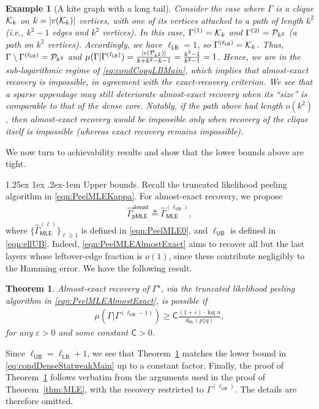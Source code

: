 \documentclass[12pt]{article}
\makeatletter
\newtheorem{example}{Example}
\newtheorem{theorem}{Theorem}
\newcommand{\calK}{{\cal K}}
\newcommand{\calP}{{\cal P}}
\newcommand{\s}[1]{\mathsf{#1}}
\renewcommand{\paragraph}{%
  \@startsection{paragraph}{4}%
  {\z@}{1.25ex \@plus 1ex \@minus .2ex}{-1em}%
  {\normalfont\normalsize\bfseries}%
}
\makeatother
\begin{document}
\begin{example}[A kite graph with a long tail]
Consider the case where $\Gamma$ is a clique $\calK_k$ on $k = |v(\calK_k)|$ vertices, with one of its vertices attached to a path of length $k^2$ (i.e., $k^2-1$ edges and $k^2$ vertices). In this case, $\Gamma^{(1)} = \calK_k$ and $\Gamma^{(2)} = \calP_{k^2}$ (a path on $k^2$ vertices). Accordingly, we have $\ell_{\s{LB}} = 1$, so $\Gamma^{(\ell_{\s{LB}})} = \calK_k$. Thus, $\Gamma\setminus\Gamma^{(\ell_{\s{LB}})} = \calP_{k^2}$ and $\mu(\Gamma\vert\Gamma^{(\ell_{\s{LB}})}) = \frac{|e(\calP_{k^2})|}{k+k^2-k-1} = \frac{k^2-1}{k^2-1} = 1$. Hence, we are in the sub-logarithmic regime of \eqref{eq:condCopyLBMain}, which implies that almost-exact recovery is impossible, in agreement with the exact-recovery criterion. We see that a sparse appendage may still deteriorate almost-exact recovery when its ``size'' is comparable to that of the dense core. Notably, if the path above had length $o(k^2)$, then almost-exact recovery would be impossible only when recovery of the clique itself is impossible (whereas exact recovery remains impossible).
\end{example}

We now turn to achievability results and show that the lower bounds above are tight.

\paragraph{Upper bounds.} Recall the truncated likelihood peeling algorithm in \eqref{eqn:PeelMLEKappa}. For almost-exact recovery, we propose
\begin{align}
    \hat{\Gamma}^{\s{almost}}_{\s{pMLE}} \triangleq \hat{\Gamma}^{(\ell_{\s{UB}})}_{\s{MLE}},\label{eqn:PeelMLEAlmostExact}
\end{align}
where $\{\hat{\Gamma}^{(\ell)}_{\s{MLE}}\}_{\ell\geq1}$ is defined in \eqref{eqn:PeelMLE0}, and $\ell_{\s{UB}}$ is defined in \eqref{eqn:ellUB}. Indeed, \eqref{eqn:PeelMLEAlmostExact} aims to recover all but the last layers whose leftover-edge fraction is $o(1)$, since these contribute negligibly to the Hamming error. We have the following result.
\begin{theorem}\label{thm:AlmostExactRec}
Almost-exact recovery of $\Gamma^\star$, via the truncated likelihood peeling algorithm in \eqref{eqn:PeelMLEAlmostExact}, is possible if
\begin{align}
    \mu(\Gamma\vert\Gamma^{(\ell_{\s{UB}}-1)})\geq \s{C}\frac{(1+\varepsilon)\cdot \log n}{d_{\s{KL}}(p||q)},\label{eqn:MLEcondAlmost}
\end{align}
for any $\varepsilon>0$ and some constant $\s{C}>0$.
\end{theorem}
Since $\ell_{\s{UB}} = \ell_{\s{LB}}+1$, we see that Theorem~\ref{thm:AlmostExactRec} matches the lower bound in \eqref{eq:condDenseStatweakMain} up to a constant factor. Finally, the proof of Theorem~\ref{thm:AlmostExactRec} follows verbatim from the arguments used in the proof of Theorem~\ref{thm:MLE}, with the recovery restricted to $\Gamma^{(\ell_{\s{UB}})}$. The details are therefore omitted.
\end{document}
